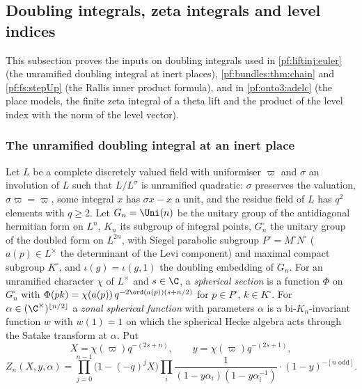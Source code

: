 \subsection{Doubling integrals, zeta integrals and level indices}\label{sec:pf:sh-theta:doubling}

This subsection proves the inputs on doubling integrals used in \cref{pf:liftinj:euler} (the unramified doubling
integral at inert places), \cref{pf:bundles:thm:chain} and \cref{pf:fs:stepUp} (the Rallis inner product formula), and in
\cref{pf:onto3:adelc} (the place models, the finite zeta integral of a theta lift and the product of the level index with
the norm of the level vector).

\subsubsection{The unramified doubling integral at an inert place}

Let $L$ be a complete discretely valued field with uniformiser $\varpi$ and $\sigma$ an involution of $L$ such that
$L/L^\sigma$ is unramified quadratic: $\sigma$ preserves the valuation, $\sigma\varpi=\varpi$, some integral $x$ has
$\sigma x-x$ a unit, and the residue field of $L$ has $q^2$ elements with $q\ge2$. Let $G_n=\Uni(n)$ be the unitary group of
the antidiagonal hermitian form on $L^n$, $K_n$ its subgroup of integral points, $G_n^\square$ the unitary group of the doubled
form on $L^{2n}$, with Siegel parabolic subgroup $P^\square=M^\square N^\square$ ($a(p)\in L^\times$ the determinant of the
Levi component) and maximal compact subgroup $K^\square$, and $\iota(g)=\iota(g,1)$ the doubling embedding of $G_n$. For an
unramified character $\chi$ of $L^\times$ and $s\in\C$, a \emph{spherical section} is a function $\Phi$ on $G^\square_n$ with
$\Phi(pk)=\chi(a(p))\,q^{-2\ord(a(p))(s+n/2)}$ for $p\in P^\square$, $k\in K^\square$. For $\alpha\in(\C^\times)^{\lfloor n/2\rfloor}$
a \emph{zonal spherical function} with parameters $\alpha$ is a bi-$K_n$-invariant function $w$ with $w(1)=1$ on which the
spherical Hecke algebra acts through the Satake transform at $\alpha$. Put
\[
X=\chi(\varpi)q^{-(2s+n)},\qquad y=\chi(\varpi)q^{-(2s+1)},
\]
\[
Z_n(X,y,\alpha)=\prod_{j=0}^{n-1}\bigl(1-(-q)^jX\bigr)\prod_{i}\frac1{(1-y\alpha_i)(1-y\alpha_i^{-1})}\cdot(1-y)^{-[n\text{ odd}]}.
\]


